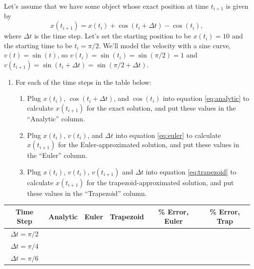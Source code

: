 \documentclass[11pt]{article}
\begin{document}
\noindent
Let's assume that we have some object whose exact position at time $t_{i+1}$ is given by
\begin{equation} \label{eq:analytic}
\boxed{x(t_{i+1}) = x(t_i) + \cos(t_i + \Delta t) - \cos(t_i)},
\end{equation}
where $\Delta t$ is the time step.
Let's set the starting position to be $x(t_i) = 10$ and the starting time to be $t_i = \pi / 2$. We'll model the velocity with a sine curve, $v(t) = \sin(t)$, so $v(t_i) = \sin(t_i) = \sin(\pi/2) = 1$ and $v(t_{i+1}) = \sin(t_i + \Delta t) = \sin(\pi/2 + \Delta t)$. \vspace{\baselineskip}

\noindent
\begin{enumerate}[resume]
    \item For each of the time steps in the table below:
    \begin{enumerate}
        \item Plug $x(t_i)$, $\cos(t_i + \Delta t)$, and $\cos(t_i)$ into equation \ref{eq:analytic} to calculate $x(t_{i+1})$ for the exact solution, and put these values in the ``Analytic'' column.
        \item Plug $x(t_i)$, $v(t_i)$, and $\Delta t$ into equation \ref{eq:euler} to calculate $x(t_{i+1})$ for the Euler-approximated solution, and put these values in the ``Euler'' column.
        \item Plug $x(t_i)$, $v(t_i)$, $v(t_{i+1})$ and $\Delta t$ into equation \ref{eq:trapezoid} to calculate $x(t_{i+1})$ for the trapezoid-approximated solution, and put these values in the ``Trapezoid'' column.
    \end{enumerate}
\end{enumerate}

\vspace{10 pt}
\begin{tabular}{c|c|c|c|c|c}
		Time Step & Analytic & Euler & Trapezoid & \% Error, Euler & \% Error, Trap  \\
\hline
\hline
$\Delta t = \pi/2$ & & & & & \\
\hline
$\Delta t = \pi/4$ & & & & & \\
\hline
$\Delta t = \pi/6$ & & & & & \\
\end{tabular}
\vspace{\baselineskip}
\end{document}
